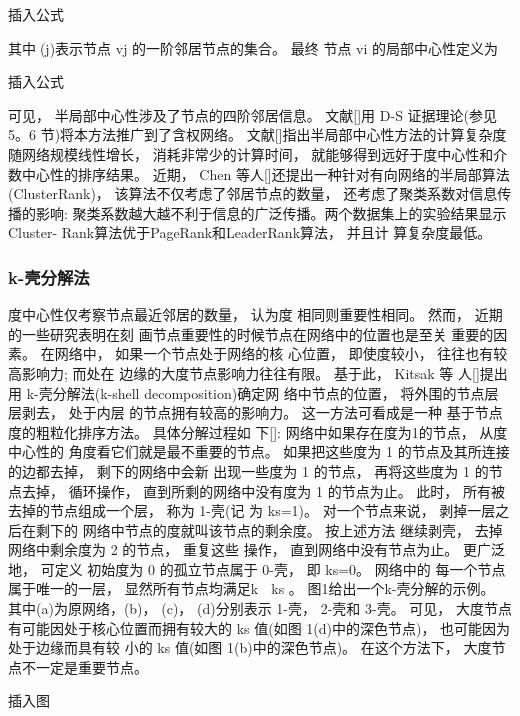				插入公式

				其中(j)表示节点 vj 的一阶邻居节点的集合。 最终 节点 vi 的局部中心性定义为

				插入公式

				可见， 半局部中心性涉及了节点的四阶邻居信息。 文献[]用 D-S 证据理论(参见 5。6 节)将本方法推广到了含权网络。 文献[]指出半局部中心性方法的计算复杂度随网络规模线性增长， 消耗非常少的计算时间， 就能够得到远好于度中心性和介数中心性的排序结果。 近期， Chen 等人[]还提出一种针对有向网络的半局部算法(ClusterRank)， 该算法不仅考虑了邻居节点的数量， 还考虑了聚类系数对信息传播的影响: 聚类系数越大越不利于信息的广泛传播。两个数据集上的实验结果显示 Cluster- Rank算法优于PageRank和LeaderRank算法， 并且计 算复杂度最低。
	\subsubsection{k-壳分解法}
	度中心性仅考察节点最近邻居的数量， 认为度 相同则重要性相同。 然而， 近期的一些研究表明在刻 画节点重要性的时候节点在网络中的位置也是至关 重要的因素。 在网络中， 如果一个节点处于网络的核 心位置， 即使度较小， 往往也有较高影响力; 而处在 边缘的大度节点影响力往往有限。 基于此， Kitsak 等 人[]提出用 k-壳分解法(k-shell decomposition)确定网 络中节点的位置， 将外围的节点层层剥去， 处于内层 的节点拥有较高的影响力。 这一方法可看成是一种 基于节点度的粗粒化排序方法。 具体分解过程如 下[]: 网络中如果存在度为1的节点， 从度中心性的 角度看它们就是最不重要的节点。 如果把这些度为 1 的节点及其所连接的边都去掉， 剩下的网络中会新 出现一些度为 1 的节点， 再将这些度为 1 的节点去掉， 循环操作， 直到所剩的网络中没有度为 1 的节点为止。 此时， 所有被去掉的节点组成一个层， 称为 1-壳(记 为 ks=1)。 对一个节点来说， 剥掉一层之后在剩下的 网络中节点的度就叫该节点的剩余度。 按上述方法 继续剥壳， 去掉网络中剩余度为 2 的节点， 重复这些 操作， 直到网络中没有节点为止。 更广泛地， 可定义 初始度为 0 的孤立节点属于 0-壳， 即 ks=0。 网络中的 每一个节点属于唯一的一层， 显然所有节点均满足k  ks 。
				图1给出一个k-壳分解的示例。 其中(a)为原网络，(b)， (c)， (d)分别表示 1-壳， 2-壳和 3-壳。 可见， 大度节点有可能因处于核心位置而拥有较大的 ks 值(如图 1(d)中的深色节点)， 也可能因为处于边缘而具有较 小的 ks 值(如图 1(b)中的深色节点)。 在这个方法下， 大度节点不一定是重要节点。

				插入图

